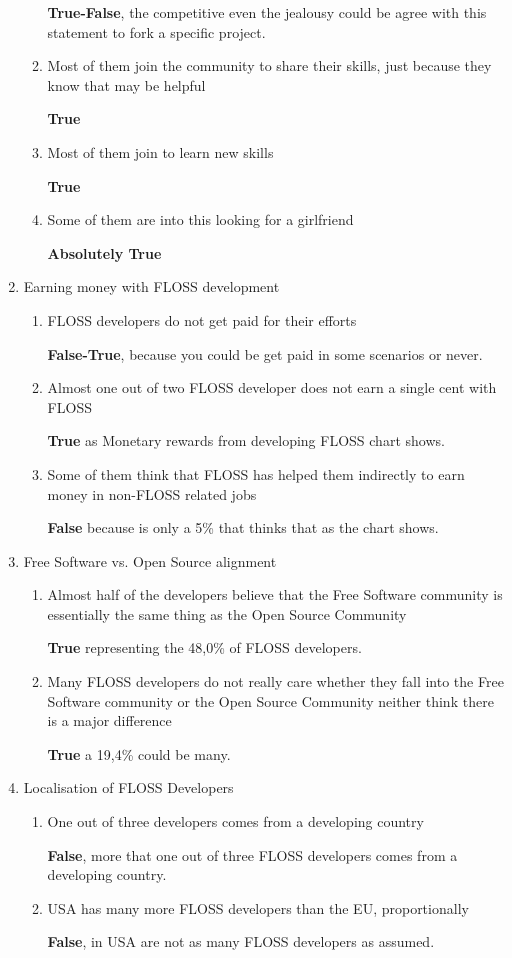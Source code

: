 \documentclass[11pt]{scrartcl}
\begin{document}
\begin{enumerate}
\begin{enumerate}
		\textbf{True-False}, the competitive even the jealousy could be agree with this statement to fork a specific project.
		\item Most of them join the community to share their skills, just because they know that may be helpful
		
		\textbf{True}
		\item Most of them join to learn new skills
		
		\textbf{True}
		\item Some of them are into this looking for a girlfriend
		
		\textbf{Absolutely True}
	\end{enumerate}

	\item Earning money with FLOSS development
	\begin{enumerate}
		\item FLOSS developers do not get paid for their efforts
		
		\textbf{False-True}, because you could be get paid in some scenarios or never.
		\item Almost one out of two FLOSS developer does not earn a single cent with FLOSS
		
		\textbf{True} as Monetary rewards from developing FLOSS chart shows.
		\item Some of them think that FLOSS has helped them indirectly to earn money in non-FLOSS related jobs
		
		\textbf{False} because is only a 5\% that thinks that as the chart shows.
	\end{enumerate}

	\item Free Software vs. Open Source alignment
	\begin{enumerate}
		\item Almost half of the developers believe that the Free Software community is essentially the same thing as the Open Source Community
		
		\textbf{True} representing the 48,0\% of FLOSS developers.
		\item Many FLOSS developers do not really care whether they fall into the Free Software community or the Open Source Community neither think there is a major difference
		
		\textbf{True} a 19,4\% could be many.
	\end{enumerate}

	\item Localisation of FLOSS Developers
	\begin{enumerate}
		\item One out of three developers comes from a developing country
		
		\textbf{False}, more that one out of three FLOSS developers comes from a developing country.
		\item USA has many more FLOSS developers than the EU, proportionally
		
		\textbf{False}, in USA are not as many FLOSS developers as assumed.
	\end{enumerate}
\end{enumerate}
\end{document}
